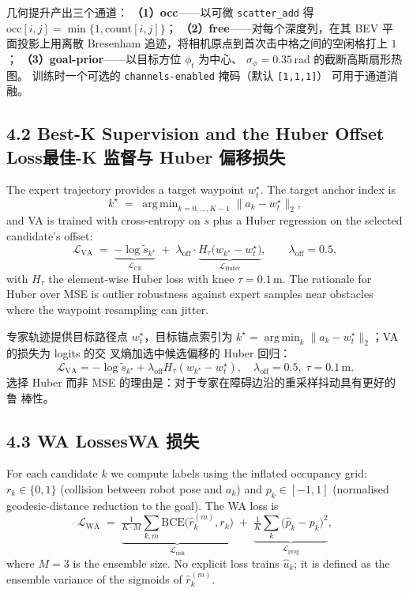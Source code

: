 \documentclass[11pt,a4paper]{article}
\newcommand{\en}[1]{\par\noindent #1\par\vspace{0.15em}}
\newcommand{\zh}[1]{\par\noindent\color{zhcol}\hspace{0.5em}#1\par\color{black}\vspace{0.6em}}
\newcommand{\bisubsec}[2]{\subsection[#1]{#1\quad\normalfont\small\color{zhcol}\textsf{#2}}}
\DeclareMathOperator*{\argmin}{arg\,min}
\begin{document}
\zh{\textsf{几何提升产出三个通道：
\textbf{（1）occ}——以可微 \texttt{scatter\_add} 得
$\mathrm{occ}[i,j] = \min\{1, \mathrm{count}[i,j]\}$；
\textbf{（2）free}——对每个深度列，在其 BEV 平面投影上用离散
Bresenham 追迹，将相机原点到首次击中格之间的空闲格打上 $1$；
\textbf{（3）goal-prior}——以目标方位 $\phi_t$ 为中心、
$\sigma_{\phi}=0.35\,$rad 的截断高斯扇形热图。
训练时一个可选的 \texttt{channels-enabled} 掩码（默认 \texttt{[1,1,1]}）
可用于通道消融。}}

\bisubsec{4.2 Best-K Supervision and the Huber Offset Loss}{最佳-K 监督与 Huber 偏移损失}

\en{The expert trajectory provides a target waypoint $w^{\star}_t$.
The target anchor index is
\begin{equation}
  k^{\star} \;=\; \argmin_{k=0,\dots,K-1} \|a_k - w^{\star}_t\|_2,
\end{equation}
and VA is trained with cross-entropy on $s$ plus a Huber regression on the
selected candidate's offset:
\begin{equation}
  \mathcal{L}_{\mathrm{VA}} \;=\;
  \underbrace{-\log \tilde{s}_{k^\star}}_{\mathcal{L}_{\mathrm{CE}}}
  \;+\; \lambda_{\mathrm{off}} \cdot
  \underbrace{H_\tau\bigl(w_{k^\star} - w^{\star}_t\bigr)}_{\mathcal{L}_{\mathrm{Huber}}},
  \qquad \lambda_{\mathrm{off}} = 0.5,
\end{equation}
with $H_\tau$ the element-wise Huber loss with knee
$\tau = 0.1\,$m. The rationale for Huber over MSE is outlier robustness
against expert samples near obstacles where the waypoint resampling can
jitter.}

\zh{\textsf{专家轨迹提供目标路径点 $w^{\star}_t$，目标锚点索引为
$k^{\star} = \argmin_k \|a_k - w^{\star}_t\|_2$；VA 的损失为 logits 的交
叉熵加选中候选偏移的 Huber 回归：
\[
 \mathcal{L}_{\mathrm{VA}} = -\log \tilde s_{k^{\star}}
 + \lambda_{\mathrm{off}} H_\tau(w_{k^{\star}} - w^{\star}_t),
 \quad \lambda_{\mathrm{off}}=0.5,\;\tau=0.1\,\mathrm{m}.
\]
选择 Huber 而非 MSE 的理由是：对于专家在障碍边沿的重采样抖动具有更好的鲁
棒性。}}

\bisubsec{4.3 WA Losses}{WA 损失}

\en{For each candidate $k$ we compute labels using the inflated occupancy
grid: $r_k \in \{0,1\}$ (collision between robot pose and $a_k$) and
$p_k \in [-1,1]$ (normalised geodesic-distance reduction to the goal).
The WA loss is
\begin{equation}
  \mathcal{L}_{\mathrm{WA}} \;=\;
  \underbrace{\tfrac{1}{K\cdot M}\sum_{k,m}\mathrm{BCE}\!\bigl(\hat r_k^{(m)}, r_k\bigr)}_{\mathcal{L}_{\mathrm{risk}}}
  \;+\;
  \underbrace{\tfrac{1}{K}\sum_{k} \bigl(\hat p_k - p_k\bigr)^2}_{\mathcal{L}_{\mathrm{prog}}},
\end{equation}
where $M=3$ is the ensemble size. No explicit loss trains $\hat u_k$; it is
defined as the ensemble variance of the sigmoids of $\hat r_k^{(m)}$.}
\end{document}
